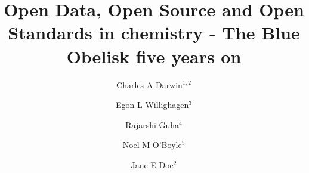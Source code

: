 \documentclass[10pt]{bmc_article}
\newenvironment{bmcformat}{\begin{raggedright}\baselineskip20pt\sloppy\setboolean{publ}{false}}{\end{raggedright}\baselineskip20pt\sloppy}
\begin{document}
\begin{bmcformat}



\title{Open Data, Open Source and Open Standards in chemistry - The Blue Obelisk five years on}
 


\author{Charles A Darwin\correspondingauthor$^{1,2}$%
      \and 
         Egon L Willighagen$^3$%
     \and 
         Rajarshi Guha$^4$%
     \and 
         Noel M O'Boyle$^5$%
      \and
         Jane E Doe\correspondingauthor$^2$%
      }
      


\address{%
    \iid(1)Life Sciences Department, Kings College London, Cornwall House,%
        Waterloo Road, London, UK\\
    \iid(2)Department of Zoology, Cambridge, Waterloo Road, London, UK\\
    \iid(3)Division of Molecular Toxicology, Institute of Environmental Medicine, %
        Nobels vaeg 13, Karolinska Institutet, 171 77 Stockholm, Sweden
    \iid(5)Analytical and Biological Chemistry Research Facility, Cavanagh Pharmacy Building, University College Cork, College Road, Cork, Co. Cork, Ireland
}%


\end{bmcformat}
\end{document}
